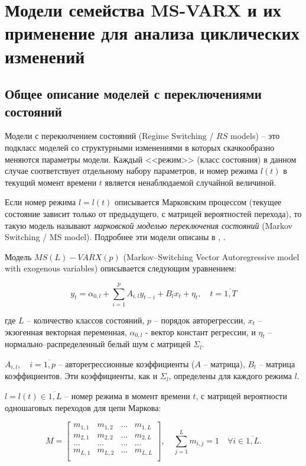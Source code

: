 \documentclass[a4paper,14pt]{extreport}
\begin{document}
	
	\section{Модели семейства MS-VARX и их применение для анализа циклических изменений}
	
	\subsection{Общее описание моделей с переключениями состояний}
	Модели с перекюлчением состояний (Regime Switching / $RS$ models) -- это подкласс моделей со структурными изменениями в которых скачкообразно меняются параметры модели. Каждый <<режим>> (класс состояния) в данном случае соответствует отдельному набору параметров, и номер режима $l(t)$ в текущий момент времени $t$ является ненаблюдаемой случайной величиной.
	
	Если номер режима $l = l(t)$ описывается Марковским процессом (текущее состояние зависит только от предыдущего, с матрицей вероятностей перехода), то такую модель называют \textit{марковской моделью переключения состояний} (Markov Switching / MS model). Подробнее эти модели описаны в \cite{malNovopMSVARX}, \cite{mal_methods_nonconstant}.
	
	Модель $MS(L)-VARX(p)$ (Markov--Switching Vector Autoregressive model with exogenous variables) описывается следующим уравнением:
	
	\begin{equation}
		y_{t} = \alpha_{0,l} + \sum_{i=1}^{p} A_{i,l} y_{t-i} + B_{l} x_{t} + \eta_{t}, 
		\quad t = \overline{1,T}
		\label{eq:var_equation}
	\end{equation}
	
	где $L$ -- количество классов состояний, $p$ -- порядок авторегрессии, $x_{t}$ -- экзогенная векторная переменная, $\alpha_{0,l}$ - вектор констант регрессии, и $\eta_{t}$ -- нормально--распределенный белый шум с матрицей $\Sigma_{l}$.
	
	$A_{i,l}, \quad i = \overline{1,p} $ -- авторегрессионные коэффициенты ($A$ -- матрица), $B_{l}$ -- матрица коэффициентов. Эти коэффициенты, как и $\Sigma_{l}$, определены для каждого режима $l$.
	
	$l=l(t) \in \overline{1,L}$ -- номер режима в момент времени $t$, с матрицей вероятности одношаговых переходов для цепи Маркова:
	
	\begin{equation}
		M=
		\left[ {\begin{array}{cccc}
			m_{1,1} & m_{1,2} & ... & m_{1,L} \\
			m_{2,1} & m_{2,2} & ... & m_{2,L} \\
			... & ... & ... & ... \\
			m_{L,1} & m_{L,2} & ... & m_{L,L} \\
			\end{array} } \right]
		, \quad
		\sum_{j=1}^{L} m_{i,j} = 1 \quad \forall i \in \overline{1,L}.
		\label{eq:M_matrix}
	\end{equation}
	
\end{document}
